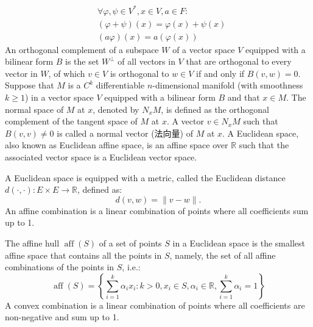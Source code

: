 \documentclass[a4paper,12pt]{article}
\begin{document}
\[\begin{aligned}
&\forall\varphi ,\psi \in V^*,x\in V,a\in F:\\
&(\varphi+\psi)(x)=\varphi (x)+\psi (x)\\
&(a\varphi )(x)=a\left(\varphi (x)\right)
\end{aligned}\]
An orthogonal complement of a subspace $W$ of a vector space $V$ equipped with a bilinear form $B$ is the set $W^{\perp }$ of all vectors in $V$ that are orthogonal to every vector in $W$, of which $v\in V$ is orthogonal to $w\in V$ if and only if $B(v,w)=0$.
Suppose that $M$ is a $C^k$ differentiable $n$-dimensional manifold (with smoothness $k\geq 1$) in a vector space $V$ equipped with a bilinear form $B$ and that $x\in M$. The normal space of $M$ at $x$, denoted by $N_xM$, is defined as the orthogonal complement of the tangent space of $M$ at $x$. A vector $v\in N_xM$ such that $B(v,v)\neq 0$ is called a normal vector (法向量) of $M$ at $x$.
A Euclidean space, also known as Euclidean affine space, is an affine space over $\mathbb{R}$ such that the associated vector space is a Euclidean vector space.

A Euclidean space is equipped with a metric, called the Euclidean distance $d(\cdot,\cdot)\colon E\times E\to\mathbb{R}$, defined as:
\[d(v,w)=\|v-w\|.\]
An affine combination is a linear combination of points where all coefficients sum up to 1.

The affine hull $\operatorname{aff} (S)$ of a set of points $S$ in a Euclidean space is the smallest affine space that contains all the points in $S$, namely, the set of all affine combinations of the points in $S$, i.e.:
\[\operatorname{aff}(S)=\left\{\sum _{i=1}^k\alpha _ix_i\colon k>0,x_i\in S,\alpha _i\in\mathbb{R},\sum _{i=1}^k\alpha _i=1\right\}\]
A convex combination is a linear combination of points where all coefficients are non-negative and sum up to 1.
\end{document}
